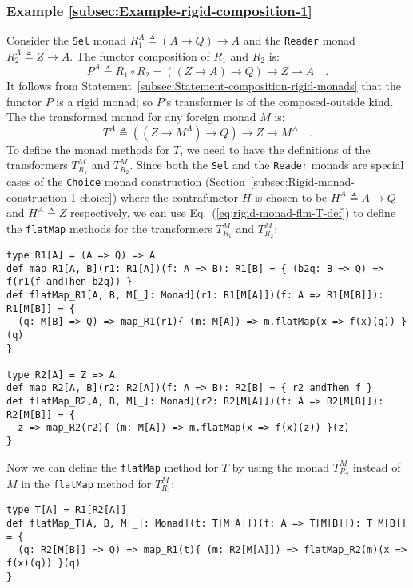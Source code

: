 \subsubsection{Example \label{subsec:Example-rigid-composition-1}\ref{subsec:Example-rigid-composition-1}}

Consider the \lstinline!Sel! monad $R_{1}^{A}\triangleq\left(A\rightarrow Q\right)\rightarrow A$
and the \lstinline!Reader! monad $R_{2}^{A}\triangleq Z\rightarrow A$.
The functor composition of $R_{1}$ and $R_{2}$ is:
\[
P^{A}\triangleq R_{1}\circ R_{2}=((Z\rightarrow A)\rightarrow Q)\rightarrow Z\rightarrow A\quad.
\]
It follows from Statement~\ref{subsec:Statement-composition-rigid-monads}
that the functor $P$ is a rigid monad; so $P$\textsf{'}s transformer is of
the composed-outside kind. The the transformed monad for any foreign
monad $M$ is:
\[
T^{A}\triangleq((Z\rightarrow M^{A})\rightarrow Q)\rightarrow Z\rightarrow M^{A}\quad.
\]
To define the monad methods for $T$, we need to have the definitions
of the transformers $T_{R_{1}}^{M}$ and $T_{R_{2}}^{M}$. Since both
the \lstinline!Sel! and the \lstinline!Reader! monads are special
cases of the \lstinline!Choice! monad construction (Section~\ref{subsec:Rigid-monad-construction-1-choice})
where the contrafunctor $H$ is chosen to be $H^{A}\triangleq A\rightarrow Q$
and $H^{A}\triangleq Z$ respectively, we can use Eq.~(\ref{eq:rigid-monad-flm-T-def})
to define the \lstinline!flatMap! methods for the transformers $T_{R_{1}}^{M}$
and $T_{R_{2}}^{M}$:
\begin{lstlisting}
type R1[A] = (A => Q) => A
def map_R1[A, B](r1: R1[A])(f: A => B): R1[B] = { (b2q: B => Q) => f(r1(f andThen b2q)) }
def flatMap_R1[A, B, M[_]: Monad](r1: R1[M[A]])(f: A => R1[M[B]]): R1[M[B]] = {
  (q: M[B] => Q) => map_R1(r1){ (m: M[A]) => m.flatMap(x => f(x)(q)) }(q)
}

type R2[A] = Z => A
def map_R2[A, B](r2: R2[A])(f: A => B): R2[B] = { r2 andThen f }
def flatMap_R2[A, B, M[_]: Monad](r2: R2[M[A]])(f: A => R2[M[B]]): R2[M[B]] = {
  z => map_R2(r2){ (m: M[A]) => m.flatMap(x => f(x)(z)) }(z)
}   
\end{lstlisting}
Now we can define the \lstinline!flatMap! method for $T$ by using
the monad $T_{R_{2}}^{M}$ instead of $M$ in the \lstinline!flatMap!
method for $T_{R_{1}}^{M}$:
\begin{lstlisting}
type T[A] = R1[R2[A]]
def flatMap_T[A, B, M[_]: Monad](t: T[M[A]])(f: A => T[M[B]]): T[M[B]] = {
  (q: R2[M[B]] => Q) => map_R1(t){ (m: R2[M[A]]) => flatMap_R2(m)(x => f(x)(q)) }(q)
}
\end{lstlisting}


